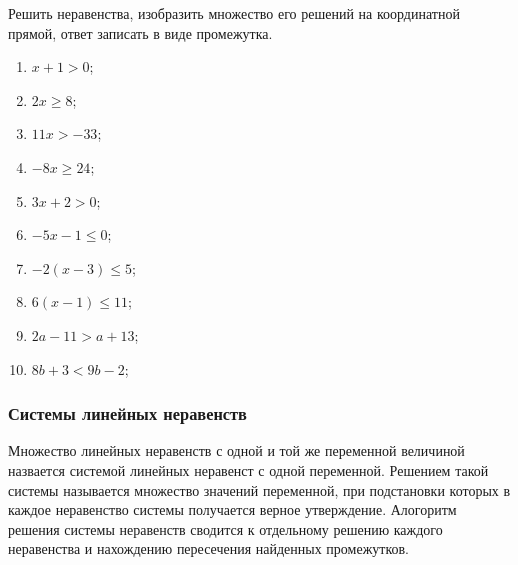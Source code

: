 \documentclass[algebra,twocolumn]{pum}
\renewcommand\le\leqslant
\renewcommand\ge\geqslant
\begin{document}
\begin{exercises}
 \begin{question}
    Решить неравенства, изобразить множество его решений на координатной прямой, ответ записать в виде промежутка. 
 \vspace{-4mm}
    \begin{multicols}{2}
      \begin{enumerate}[label=\arabic*),nosep]
        \item $x+1>0$;
        \item $2x\ge8$;
        \item $11x>-33$;
        \item $-8x\ge24$;
        \item $3x+2>0$;
        \item $-5x-1\le0$;
        \item $-2(x-3)\le5$;
        \item $6(x-1)\le11$;
        \item $2a-11>a+13$;
        \item $8b+3<9b-2$;
      \end{enumerate}
    \end{multicols}
  \end{question}
\end{exercises}

\subsubsection*{Системы линейных неравенств}
Множество линейных неравенств с одной и той же переменной величиной назвается системой линейных неравенст с одной переменной. Решением такой системы называется множество значений переменной, при подстановки которых в каждое неравенство системы получается верное утверждение. Алогоритм решения системы неравенств сводится к отдельному решению каждого неравенства и нахождению пересечения найденных промежутков.
\end{document}
